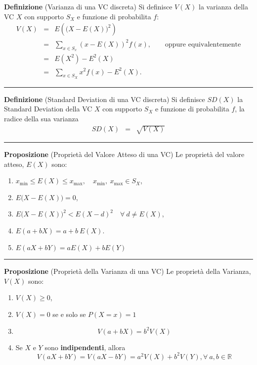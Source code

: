 \documentclass[
  11pt,
]{book}
\providecommand{\tightlist}{%
  \setlength{\itemsep}{0pt}\setlength{\parskip}{0pt}}
\theoremstyle{mytheoremstyle}
\theoremstyle{mydefstyle}
\begin{document}
\textbf{Definizione} (Varianza di una VC discreta)
Si definisce \(V(X)\) la varianza della VC \(X\) con supporto \(S_X\) e funzione di probabilita \(f\):
\begin{eqnarray*}
V(X)&=&E\left(\big(X-E(X)\big)^2\right)\\
    &=&\sum_{x\in S_x}(x-E(X))^2f(x),\qquad\text{oppure equivalentemente}\\
    &=& E(X^2)-E^2(X)\\
    &=&\sum_{x\in S_X}x^2f(x)-E^2(X).
\end{eqnarray*}

\begin{center}\rule{0.5\linewidth}{0.5pt}\end{center}

\textbf{Definizione} (Standard Deviation di una VC discreta)
Si definisce \(SD(X)\) la Standard Deviation della VC \(X\) con supporto \(S_X\) e funzione di probabilita \(f\),
la radice della sua varianza
\begin{eqnarray*}
SD(X)&=&\sqrt{V(X)}
\end{eqnarray*}

\begin{center}\rule{0.5\linewidth}{0.5pt}\end{center}

\textbf{Proposizione} (Proprietà del Valore Atteso di una VC)
Le proprietà del valore atteso, \(E(X)\) sono:

\begin{enumerate}
\def\labelenumi{\arabic{enumi}.}
\tightlist
\item
  \(x_{\min} \leq E(X) \leq x_{\max}, \quad x_{\min},\ x_{\max}\in S_{X}\),
\item
  \(E\Big(X - E(X)\Big) = 0\),
\item
  \(E\Big(X - E(X)\Big)^{2} < E(X - d)^{2} \quad\forall\ d \ne E(X)\),
\item
  \(E(a + b X) = a + b\ E(X)\).
\item
  \(E(aX+bY)=aE(X)+bE(Y)\)
\end{enumerate}

\begin{center}\rule{0.5\linewidth}{0.5pt}\end{center}

\textbf{Proposizione} (Proprietà della Varianza di una VC)
Le proprietà della Varianza, \(V(X)\) sono:

\begin{enumerate}
\def\labelenumi{\arabic{enumi}.}
\tightlist
\item
  \(V(X)\geq 0\),
\item
  \(V(X)=0\) se e solo se \(P(X=x)=1\)
\item
  \[V(a+bX)=b^2V(X)\]
\item
  Se \(X\) e \(Y\) sono \textbf{indipendenti}, allora
  \[V(aX+bY)=V(aX-bY)=a^2V(X)+b^2V(Y), \forall~a,b\in\mathbb{R}\]
\end{enumerate}
\end{document}

